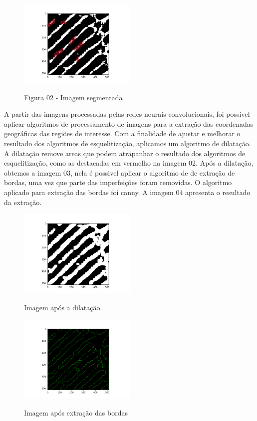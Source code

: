 \documentclass[conference]{IEEEtran}
\begin{document}
\begin{figure}
    \centering
    \caption{Figura 02 - Imagem segmentada}
    \includegraphics[width=0.5\textwidth]{images/02.png}
    \label{fig:02}
\end{figure}


A partir das imagens processadas pelas redes neurais convolucionais, foi possivel aplicar algoritmos
de processamento de imagens para a extração das coordenadas geográficas das regiões de interesse. Com a
finalidade de ajustar e melhorar o resultado dos algoritmos de esquelitização, aplicamos um algoritmo de dilatação. A
dilatação remove areas que podem atrapanhar o resultado dos algoritmos de esquelitização, como as destacadas em vermelho 
na imagem 02. Após a dilatação, obtemos a imagem 03, nela é possivel aplicar o algoritmo de de extração de bordas, uma vez que parte
das imperfeições foram removidas. O algoritmo aplicado para extração das bordas foi canny. A imagem 04 apresenta o resultado da extração.

\begin{figure}
    \centering
    \caption{Imagem após a dilatação}
    \includegraphics[width=0.5\textwidth]{images/05.png}
    \label{fig:03}
\end{figure}

\begin{figure}
    \centering
    \caption{Imagem após extração das bordas}
    \includegraphics[width=0.5\textwidth]{images/03.png}
    \label{fig:04}
\end{figure}
\end{document}
